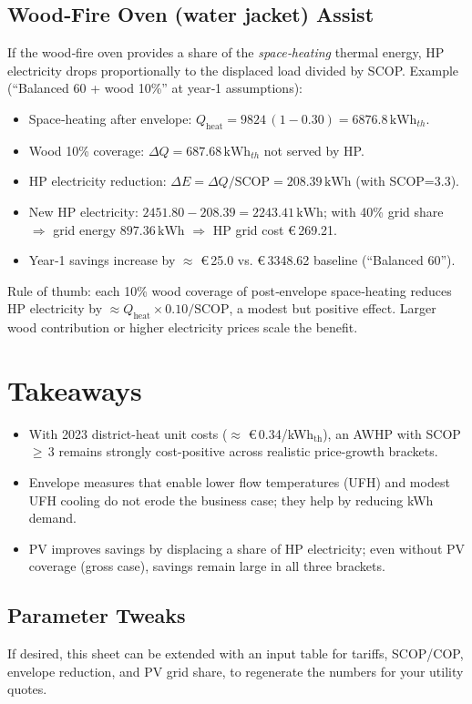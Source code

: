 \documentclass[11pt,oneside]{report}
\begin{document}
\section{Wood‑Fire Oven (water jacket) Assist}
If the wood‑fire oven provides a share of the \emph{space‑heating} thermal energy, HP electricity drops proportionally to the displaced load divided by SCOP. Example (``Balanced 60 + wood 10\%'' at year‑1 assumptions):
\begin{itemize}
  \item Space‑heating after envelope: \(Q_\mathrm{heat}=9824\,(1-0.30)=\num{6876.8}\,\mathrm{kWh}_{th}\).
  \item Wood 10\% coverage: \(\Delta Q = \num{687.68}\,\mathrm{kWh}_{th}\) not served by HP.
  \item HP electricity reduction: \(\Delta E=\Delta Q/\mathrm{SCOP}=\num{208.39}\,\mathrm{kWh}\) (with SCOP=\num{3.3}).
  \item New HP electricity: \(\num{2451.80}-\num{208.39}=\num{2243.41}\,\mathrm{kWh}\); with 40\% grid share \(\Rightarrow\) grid energy \(\num{897.36}\,\mathrm{kWh}\) \(\Rightarrow\) HP grid cost \euro\,\num{269.21}.
  \item Year‑1 savings increase by \(\approx\) \euro\,\num{25.0} vs. \euro\,\num{3348.62} baseline (``Balanced 60'').
\end{itemize}
Rule of thumb: each 10\% wood coverage of post‑envelope space‑heating reduces HP electricity by \(\approx Q_\mathrm{heat}\times 0.10/\mathrm{SCOP}\), a modest but positive effect. Larger wood contribution or higher electricity prices scale the benefit.

\chapter{Takeaways}
\begin{itemize}
  \item With 2023 district-heat unit costs (\(\approx\) \euro\,\num{0.34}/kWh$_\mathrm{th}$), an AWHP with SCOP \(\ge\)\,\num{3} remains strongly cost-positive across realistic price-growth brackets.
  \item Envelope measures that enable lower flow temperatures (UFH) and modest UFH cooling do not erode the business case; they help by reducing kWh demand.
  \item PV improves savings by displacing a share of HP electricity; even without PV coverage (gross case), savings remain large in all three brackets.
\end{itemize}

\section*{Parameter Tweaks}
If desired, this sheet can be extended with an input table for tariffs, SCOP/COP, envelope reduction, and PV grid share, to regenerate the numbers for your utility quotes.
\end{document}
